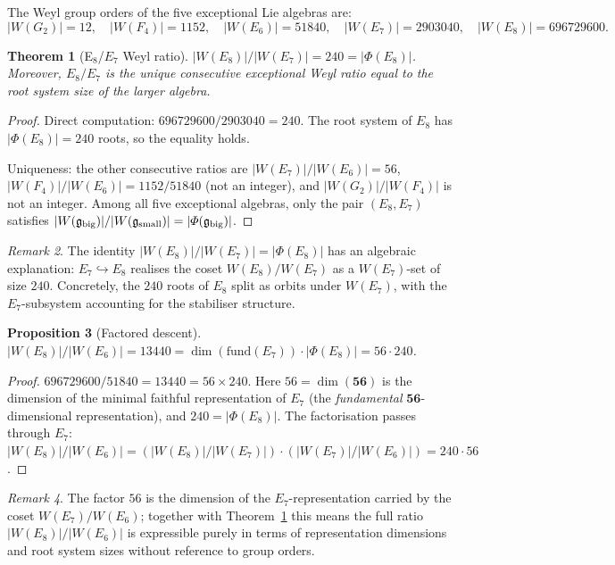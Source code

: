 \documentclass[11pt]{amsart}
\theoremstyle{plain}
\newtheorem{theorem}{Theorem}[section]
\newtheorem{proposition}[theorem]{Proposition}
\theoremstyle{definition}
\theoremstyle{remark}
\newtheorem{remark}[theorem]{Remark}
\renewcommand{\Phi}{\varPhi}
\begin{document}
The Weyl group orders of the five exceptional Lie algebras are:
\[
  |W(G_2)| = 12,\quad
  |W(F_4)| = 1152,\quad
  |W(E_6)| = 51840,\quad
  |W(E_7)| = 2903040,\quad
  |W(E_8)| = 696729600.
\]

\begin{theorem}[E$_8$/$E_7$ Weyl ratio]\label{thm:weyl-E8-E7}
  $|W(E_8)|/|W(E_7)| = 240 = |\Phi(E_8)|$.
  Moreover, $E_8/E_7$ is the \emph{unique} consecutive exceptional
  Weyl ratio equal to the root system size of the larger algebra.
\end{theorem}

\begin{proof}
  Direct computation: $696729600 / 2903040 = 240$.  The root system of
  $E_8$ has $|\Phi(E_8)| = 240$ roots, so the equality holds.

  Uniqueness: the other consecutive ratios are
  $|W(E_7)|/|W(E_6)| = 56$, $|W(F_4)|/|W(E_6)| = 1152/51840$ (not an
  integer), and $|W(G_2)|/|W(F_4)|$ is not an integer.
  Among all five exceptional algebras, only the pair $(E_8, E_7)$
  satisfies $|W(\mathfrak{g}_{\rm big})|/|W(\mathfrak{g}_{\rm small})| =
  |\Phi(\mathfrak{g}_{\rm big})|$.
\end{proof}

\begin{remark}
  The identity $|W(E_8)|/|W(E_7)| = |\Phi(E_8)|$ has an algebraic
  explanation: $E_7 \hookrightarrow E_8$ realises the coset
  $W(E_8)/W(E_7)$ as a $W(E_7)$-set of size $240$.  Concretely, the
  $240$ roots of $E_8$ split as orbits under $W(E_7)$, with the
  $E_7$-subsystem accounting for the stabiliser structure.
\end{remark}

\begin{proposition}[Factored descent]\label{prop:weyl-E8-E6}
  $|W(E_8)|/|W(E_6)| = 13440 = \dim(\mathrm{fund}(E_7))\cdot|\Phi(E_8)| = 56\cdot 240$.
\end{proposition}

\begin{proof}
  $696729600 / 51840 = 13440 = 56 \times 240$.  Here $56 = \dim(\mathbf{56})$
  is the dimension of the minimal faithful representation of $E_7$
  (the \emph{fundamental} $\mathbf{56}$-dimensional representation), and
  $240 = |\Phi(E_8)|$.  The factorisation passes through $E_7$:
  $|W(E_8)|/|W(E_6)| = (|W(E_8)|/|W(E_7)|)\cdot(|W(E_7)|/|W(E_6)|)
  = 240 \cdot 56$.
\end{proof}

\begin{remark}
  The factor $56$ is the dimension of the $E_7$-representation carried
  by the coset $W(E_7)/W(E_6)$; together with Theorem~\ref{thm:weyl-E8-E7}
  this means the full ratio $|W(E_8)|/|W(E_6)|$ is expressible purely in
  terms of representation dimensions and root system sizes without
  reference to group orders.
\end{remark}
\end{document}
